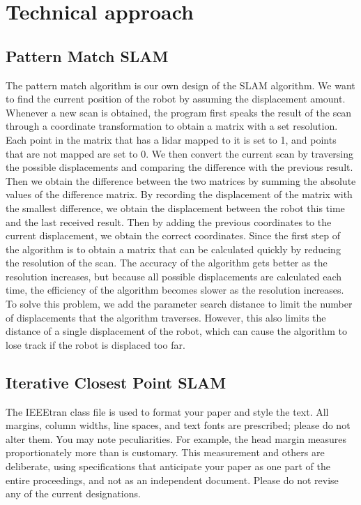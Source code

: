 \documentclass[conference]{IEEEtran}
\begin{document}
\section{Technical  approach}
\subsection{Pattern Match SLAM}
The pattern match algorithm is our own design of the SLAM algorithm. We want to find the current position of the robot by assuming the displacement amount. Whenever a new scan is obtained, the program first speaks the result of the scan through a coordinate transformation to obtain a matrix with a set resolution. Each point in the matrix that has a lidar mapped to it is set to 1, and points that are not mapped are set to 0. We then convert the current scan by traversing the possible displacements and comparing the difference with the previous result. Then we obtain the difference between the two matrices by summing the absolute values of the difference matrix. By recording the displacement of the matrix with the smallest difference, we obtain the displacement between the robot this time and the last received result. Then by adding the previous coordinates to the current displacement, we obtain the correct coordinates. Since the first step of the algorithm is to obtain a matrix that can be calculated quickly by reducing the resolution of the scan. The accuracy of the algorithm gets better as the resolution increases, but because all possible displacements are calculated each time, the efficiency of the algorithm becomes slower as the resolution increases. To solve this problem, we add the parameter search distance to limit the number of displacements that the algorithm traverses. However, this also limits the distance of a single displacement of the robot, which can cause the algorithm to lose track if the robot is displaced too far.

\subsection{Iterative Closest Point SLAM}
The IEEEtran class file is used to format your paper and style the text. All margins, 
column widths, line spaces, and text fonts are prescribed; please do not 
alter them. You may note peculiarities. For example, the head margin
measures proportionately more than is customary. This measurement 
and others are deliberate, using specifications that anticipate your paper 
as one part of the entire proceedings, and not as an independent document. 
Please do not revise any of the current designations.
\end{document}
